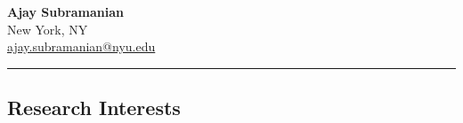 \documentclass[10pt,letterpaper]{article}
\begin{document}
\begin{center}
	{\LARGE \textbf{Ajay Subramanian}}\\
	New York, NY
	\vspace{0.05cm}
	\\
    \href{mailto:as15003@nyu.edu}{ajay.subramanian@nyu.edu} 
	\hspace{0.5cm}
    \href{https://x.com/ajaysub110}{\raisebox{-0.2\height} {\Large \faTwitterSquare}} 
	\hspace{0.5cm}
	\href{https://github.com/ajaysub110}{\raisebox{-0.2\height}{\Large \faGithubSquare}} 
	\hspace{0.5cm}
	\href{https://www.linkedin.com/in/ajaysub110/}{\raisebox{-0.2\height}{\Large \faLinkedin}} 
	\hspace{0.5cm}
	\href{https://scholar.google.com/citations?user=6cyu_EgAAAAJ&hl=en}{\raisebox{-0.2\height}{\Large \faGraduationCap}}

\end{center}

\hrule
\vspace{-1em}
\subsection*{\Large Research Interests}
\end{document}
